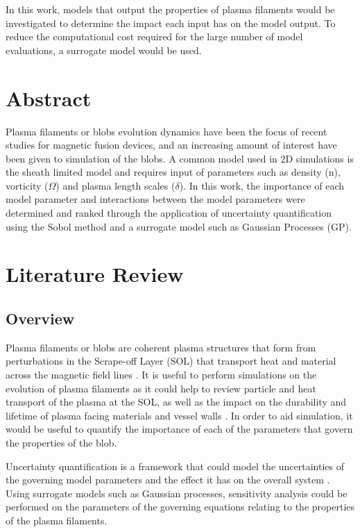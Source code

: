\documentclass{article}
\begin{document}
In this work, models that output the properties of plasma filaments would be investigated to determine the impact each input has on the model output. To reduce the computational cost required for the large number of model evaluations, a surrogate model would be used.    

\section*{Abstract}
Plasma filaments or blobs evolution dynamics have been the focus of recent studies for magnetic fusion devices, and an increasing amount of interest have been given to simulation of the blobs. A common model used in 2D simulations is the sheath limited model and requires input of parameters such as density (n), vorticity ($\Omega$) and plasma length scales ($\delta$). In this work, the importance of each model parameter and interactions between the model parameters were determined and ranked through the application of uncertainty quantification using the Sobol method and a surrogate model such as Gaussian Processes (GP).

\section*{Literature Review}
\subsection*{Overview}
Plasma filaments or blobs are coherent plasma structures that form from perturbations in the Scrape-off Layer (SOL) that transport heat and material across the magnetic field lines \cite{dippolito_convective_2011, hoare_dynamics_2019}. It is useful to perform simulations on the evolution of plasma filaments as it could help to review particle and heat transport of the plasma at the SOL, as well as the impact on the durability and lifetime of plasma facing materials and vessel walls \cite{carralero_experimental_2015, krasheninnikov_recent_2008}. In order to aid simulation, it would be useful to quantify the importance of each of the parameters that govern the properties of the blob.

Uncertainty quantification is a framework that could model the uncertainties of the governing model parameters and the effect it has on the overall system \cite{sudret_surrogate_2017}. Using surrogate models such as Gaussian processes, sensitivity analysis could be performed on the parameters of the governing equations relating to the properties of the plasma filaments.
\end{document}

